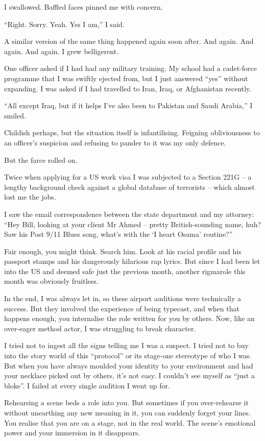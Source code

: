 \documentclass[10pt,a4paper]{article}
\begin{document}
I swallowed. Baffled faces pinned me with concern.

“Right. Sorry. Yeah. Yes I am,” I said.

A similar version of the same thing happened again soon after. And again. And again. And again. I grew belligerent.

One officer asked if I had had any military training. My school had a cadet-force programme that I was swiftly ejected from, but I just answered “yes” without expanding. I was asked if I had travelled to Iran, Iraq, or Afghanistan recently.

“All except Iraq, but if it helps I’ve also been to Pakistan and Saudi Arabia,” I smiled.

Childish perhaps, but the situation itself is infantilising. Feigning obliviousness to an officer’s suspicion and refusing to pander to it was my only defence.

But the farce rolled on.

Twice when applying for a US work visa I was subjected to a Section 221G – a lengthy background check against a global database of terrorists – which almost lost me the jobs.

I saw the email correspondence between the state department and my attorney: “Hey Bill, looking at your client Mr Ahmed – pretty British-sounding name, huh? Saw his Post 9/11 Blues song, what’s with the ‘I heart Osama’ routine?”

Fair enough, you might think. Search him. Look at his racial profile and his passport stamps and his dangerously hilarious rap lyrics. But since I had been let into the US and deemed safe just the previous month, another rigmarole this month was obviously fruitless.

In the end, I was always let in, so these airport auditions were technically a success. But they involved the experience of being typecast, and when that happens enough, you internalise the role written for you by others. Now, like an over-eager method actor, I was struggling to break character.

I tried not to ingest all the signs telling me I was a suspect. I tried not to buy into the story world of this “protocol” or its stage-one stereotype of who I was. But when you have always moulded your identity to your environment and had your necklace picked out by others, it’s not easy. I couldn’t see myself as “just a bloke”. I failed at every single audition I went up for.

Rehearsing a scene beds a role into you. But sometimes if you over-rehearse it without unearthing any new meaning in it, you can suddenly forget your lines. You realise that you are on a stage, not in the real world. The scene’s emotional power and your immersion in it disappears.
\end{document}
